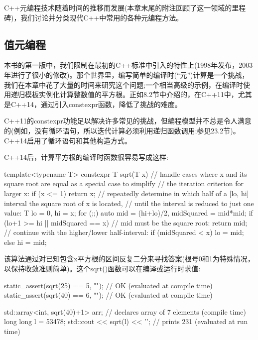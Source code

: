 
C++元编程技术随着时间的推移而发展(本章末尾的附注回顾了这一领域的里程碑)，我们讨论并分类现代C++中常用的各种元编程方法。

\subsection{值元编程}

本书的第一版中，我们限制在最初的C++标准中引入的特性上(1998年发布，2003年进行了很小的修改)。那个世界里，编写简单的编译时(“元”)计算是一个挑战，我们在本章中花了大量的时间来研究这个问题;一个相当高级的示例，在编译时使用递归模板实例化计算整数值的平方根。正如8.2节中介绍的，在C++11中，尤其是C++14，通过引入constexpr函数，降低了挑战的难度。

\begin{notice}C++11的constexpr功能足以解决许多常见的挑战，但编程模型并不总是令人满意的(例如，没有循环语句，所以迭代计算必须利用递归函数调用;参见23.2节)。C++14启用了循环语句和其他构造方式。
\end{notice}

C++14后，计算平方根的编译时函数很容易写成这样:

\begin{cpp}
template<typename T>
constexpr T sqrt(T x)
{
	// handle cases where x and its square root are equal as a special case to simplify
	// the iteration criterion for larger x:
	if (x <= 1) {
		return x;
	}
	// repeatedly determine in which half of a [lo, hi] interval the square root of x is located,
	// until the interval is reduced to just one value:
	T lo = 0, hi = x;
	for (;;) {
		auto mid = (hi+lo)/2, midSquared = mid*mid;
		if (lo+1 >= hi || midSquared == x) {
			// mid must be the square root:
			return mid;
		}
		// continue with the higher/lower half-interval:
		if (midSquared < x) {
			lo = mid;
		}
		else {
			hi = mid;
		}
	}
}
\end{cpp}

该算法通过对已知包含x平方根的区间反复二分来寻找答案(根号0和1为特殊情况，以保持收敛准则简单)。这个sqrt()函数可以在编译或运行时求值:

\begin{cpp}
static_assert(sqrt(25) == 5, ""); // OK (evaluated at compile time)
static_assert(sqrt(40) == 6, ""); // OK (evaluated at compile time)

std::array<int, sqrt(40)+1> arr; // declares array of 7 elements (compile time)
long long l = 53478;
std::cout << sqrt(l) << ’\n’; // prints 231 (evaluated at run time)
\end{cpp}

